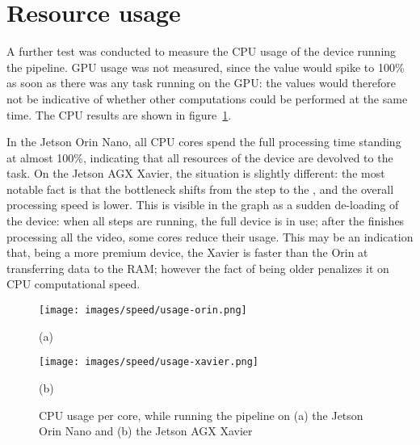 \section{Resource usage}

A further test was conducted to measure the CPU usage of the device running the pipeline.
GPU usage was not measured, since the value would spike to 100\% as soon as there was any task running on the GPU: the values would therefore not be indicative of whether other computations could be performed at the same time.
The CPU results are shown in figure~\ref{fig:usage}.

In the Jetson Orin Nano, all CPU cores spend the full processing time standing at almost 100\%, indicating that all resources of the device are devolved to the task.
On the Jetson AGX Xavier, the situation is slightly different: the most notable fact is that the bottleneck shifts from the \locate* step to the \match*, and the overall processing speed is lower.
This is visible in the graph as a sudden de-loading of the device: when all steps are running, the full device is in use; after the \locate* finishes processing all the video, some cores reduce their usage.
This may be an indication that, being a more premium device, the Xavier is faster than the Orin at transferring data to the RAM; however the fact of being older penalizes it on CPU computational speed.

\begin{figure}
	\captionsetup{list=false}
	
	\centering
	\texttt{[image: images/speed/usage-orin.png]}
	\caption*{(a)}
	\endminipage\hfill
	\texttt{[image: images/speed/usage-xavier.png]}
	\caption*{(b)}
	\endminipage

	\captionsetup{list=true}

	\caption{\centering CPU usage per core, while running the pipeline on (a) the Jetson Orin Nano and (b) the Jetson AGX Xavier}\label{fig:usage}
\end{figure}
